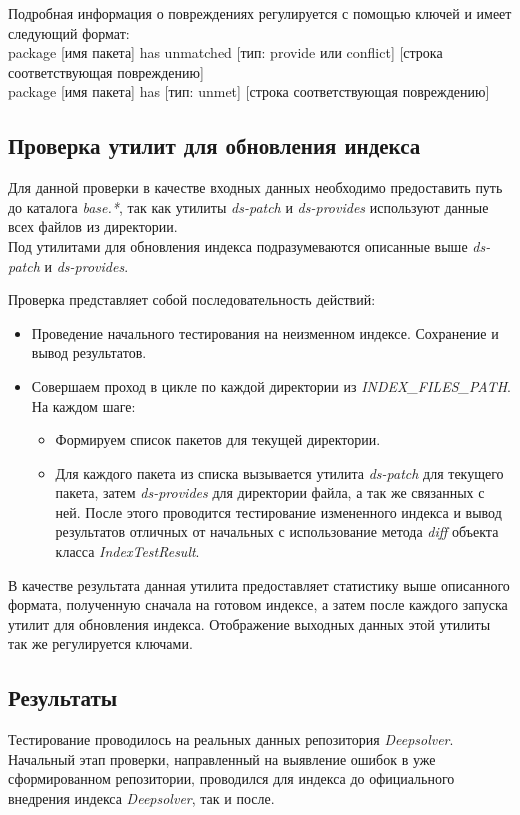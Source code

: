 Подробная информация о повреждениях регулируется с помощью ключей и имеет следующий формат:\\
package [имя пакета] has unmatched [тип: provide или conflict] [строка соответствующая повреждению]\\
package [имя пакета] has [тип: unmet] [строка соответствующая повреждению]\\

\subsection{Проверка утилит для обновления индекса}
Для данной проверки в качестве входных данных необходимо предоставить
путь до каталога \textit{base.*}, так как утилиты \textit{ds-patch} и 
\textit{ds-provides} используют данные всех файлов из директории.\\
Под утилитами для обновления индекса подразумеваются описанные
выше \textit{ds-patch} и \textit{ds-provides}.

Проверка представляет собой последовательность действий:\\
\begin{itemize}
\item{Проведение начального тестирования на неизменном индексе. Сохранение
и вывод результатов.}
\item{Совершаем проход в цикле по каждой директории из \emph{INDEX\_FILES\_PATH}. На
каждом шаге:
	\begin{itemize}
	\item{Формируем список пакетов для текущей директории.}
	\item{Для каждого пакета из списка вызывается утилита \textit{ds-patch }
	для текущего пакета, затем \textit{ds-provides} для директории файла, а 
	так же связанных с ней. После этого проводится тестирование
	измененного индекса и вывод результатов отличных от начальных
	с использование метода \textit{diff} объекта класса \textit{IndexTestResult}.}
	\end{itemize}
}
\end{itemize}

В качестве результата данная утилита предоставляет статистику выше описанного формата,
полученную сначала на готовом индексе, а затем после каждого запуска утилит для обновления
индекса. Отображение выходных данных этой утилиты так же регулируется ключами.

\subsection{Результаты}
Тестирование проводилось на реальных данных репозитория \textit{Deepsolver}.
Начальный этап проверки, направленный на выявление ошибок в уже сформированном репозитории,
проводился для индекса до официального внедрения индекса \textit{Deepsolver}, так и 
после.\\
